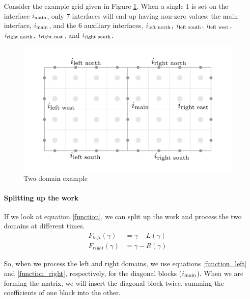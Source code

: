 \documentclass[12pt]{article}
\begin{document}
Consider the example grid given in Figure \ref{2domain}.
When a single $1$ is set on the interface $i_{\textnormal{main}}$, only 7 interfaces will end up
having non-zero values: the main interface, $i_{\textnormal{main}}$, and the 6 auxiliary
interfaces, 
$i_{\textnormal{left north}}$, $i_{\textnormal{left south}}$, $i_{\textnormal{left west}}$,
$i_{\textnormal{right north}}$, $i_{\textnormal{right east}}$, and $i_{\textnormal{right south}}$.

\begin{figure}[H]
    \centering
    \includegraphics[width=6in]{images/2domain.pdf}
    \caption{Two domain example}
    \label{2domain}
\end{figure}

\paragraph{Splitting up the work}

If we look at equation \ref{function}, we can split up the work and process the two domains at
different times.
\begin{align}
    F_{left}(\gamma)&=\gamma-L(\gamma) \label{function_left}\\
    F_{right}(\gamma)&=\gamma-R(\gamma) \label{function_right}
\end{align}

So, when we process the left and right domains, we use equations \ref{function_left} and 
\ref{function_right}, respectively, for the diagonal blocks ($i_{\textnormal{main}}$).
When we are forming the matrix, we will insert the diagonal
block twice, summing the coefficients of one block into the other.
\end{document}
